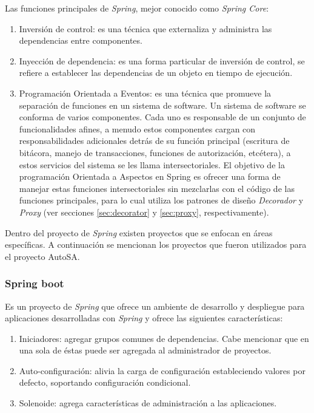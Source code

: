 Las funciones principales de \textit{Spring}, mejor conocido como \textit{Spring Core}\cite{Spring5DesignPatterns, ProSpring5, WellGroundedJavaDeveloper, SpringInAction}:
\begin{enumerate}
	\item Inversión de control: es una técnica que externaliza y administra las dependencias entre componentes.

	\item Inyección de dependencia: es una forma particular de inversión de control, se refiere a establecer las dependencias de un objeto en tiempo de ejecución.

	\item Programación Orientada a Eventos: es una técnica que promueve la separación de funciones en un sistema de software. Un sistema de software se conforma de varios componentes. Cada uno es responsable de un conjunto de funcionalidades afines, a menudo estos componentes cargan con responsabilidades adicionales detrás de su función principal (escritura de bitácora, manejo de transacciones, funciones de autorización, etcétera), a estos servicios del sistema se les llama intersectoriales. El objetivo de la programación Orientada a Aspectos en Spring  es ofrecer una forma de manejar estas funciones intersectoriales sin mezclarlas con el código de las funciones principales, para lo cual utiliza los patrones de diseño \textit{Decorador} y \textit{Proxy} (ver secciones \ref{sec:decorator} y \ref{sec:proxy}, respectivamente).
\end{enumerate}

Dentro del proyecto de \textit{Spring} existen proyectos que se enfocan en áreas específicas. A continuación se mencionan los proyectos que fueron utilizados para el proyecto AutoSA.

\subsubsection{Spring boot}\label{sec:spring-boot}
Es un proyecto de \textit{Spring} que ofrece un ambiente de desarrollo y despliegue para aplicaciones desarrolladas con \textit{Spring} y ofrece las siguientes características\cite{SpringBootInAction}:
\begin{enumerate}
	\item Iniciadores: agregar grupos comunes de dependencias. Cabe mencionar que en una sola de éstas puede ser agregada al administrador de proyectos.
	\item Auto-configuración: alivia la carga de configuración estableciendo valores por defecto, soportando configuración condicional.
	\item Solenoide: agrega características de administración a las aplicaciones.
\end{enumerate}

